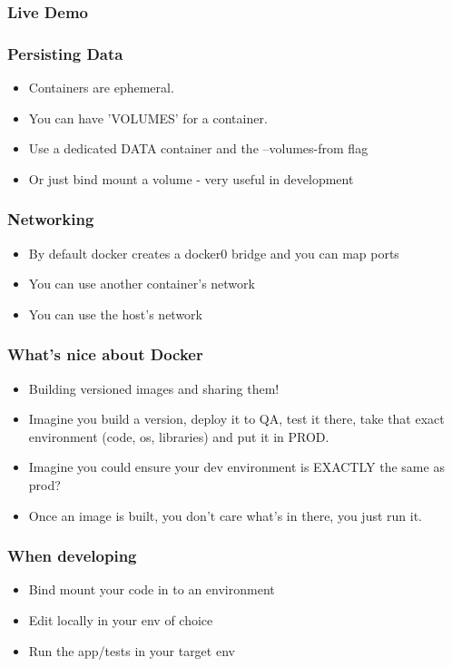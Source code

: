 \documentclass{beamer}
\begin{document}
\begin{frame}
  \frametitle{Live Demo}
\end{frame}

\begin{frame}
  \frametitle{Persisting Data}
  \begin{itemize}
  \item Containers are ephemeral.
  \item You can have 'VOLUMES' for a container.
  \item Use a dedicated DATA container and the --volumes-from flag
  \item Or just bind mount a volume - very useful in development
  \end{itemize}
\end{frame}

\begin{frame}
  \frametitle{Networking}
  \begin{itemize}
  \item By default docker creates a docker0 bridge and you can map ports
  \item You can use another container's network
  \item You can use the host's network
  \end{itemize}
\end{frame}

\begin{frame}
  \frametitle{What's nice about Docker}
  \begin{itemize}
  \item Building versioned images and sharing them!
  \item Imagine you build a version, deploy it to QA, test it there, take that exact environment (code, os, libraries) and put it in PROD.
  \item Imagine you could ensure your dev environment is EXACTLY the same as prod?
  \item Once an image is built, you don't care what's in there, you just run it.
  \end{itemize}
\end{frame}

\begin{frame}
  \frametitle{When developing}
  \begin{itemize}
  \item Bind mount your code in to an environment
  \item Edit locally in your env of choice
  \item Run the app/tests in your target env
  \end{itemize}
\end{frame}
\end{document}

